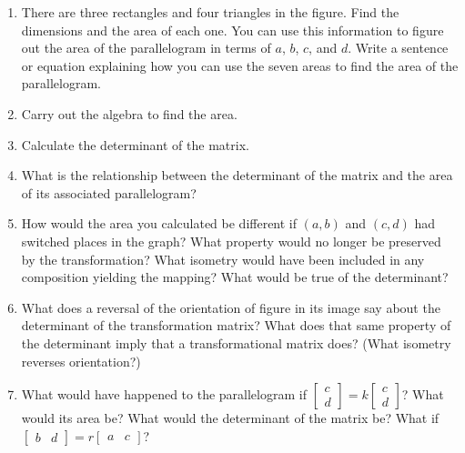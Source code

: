 \documentclass[../gatm.tex]{subfiles}
\begin{document}
\begin{enumerate}
\begin{enumerate}
\item There are three rectangles and four triangles in the figure. Find the dimensions and the area of each one. You can use this information to figure out the area of the parallelogram in terms of $a$, $b$, $c$, and $d$. Write a sentence or equation explaining how you can use the seven areas to find the area of the parallelogram.
\item Carry out the algebra to find the area.
\item Calculate the determinant of the matrix.
\item What is the relationship between the determinant of the matrix and the area of its associated parallelogram?
\item How would the area you calculated be different if $(a,b)$ and $(c,d)$ had switched places in the graph? What property would no longer be preserved by the transformation? What isometry would have been included in any composition yielding the mapping? What would be true of the determinant?
\item What does a reversal of the orientation of figure in its image say about the determinant of the transformation matrix? What does that same property of the determinant imply that a transformational matrix does? (What isometry reverses orientation?)
\item What would have happened to the parallelogram if $\left[\begin{smallmatrix}c \\ d \end{smallmatrix}\right]=k\left[\begin{smallmatrix}c \\ d \end{smallmatrix}\right]$? What would its area be? What would the determinant of the matrix be? What if $\left[\begin{smallmatrix}b & d \end{smallmatrix}\right]=r\left[\begin{smallmatrix}a & c \end{smallmatrix}\right]$?
\end{enumerate}
\end{enumerate}
\end{document}
